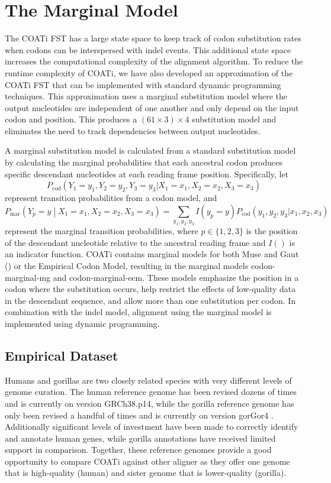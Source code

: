 \documentclass[12pt,letterpaper]{article}
\begin{document}
\section*{The Marginal Model}

The COATi FST has a large state space to keep track of codon substitution rates when codons can be interspersed with indel events. This additional state space increases the computational complexity of the alignment algorithm. To reduce the runtime complexity of COATi, we have also developed an approximation of the COATi FST that can be implemented with standard dynamic programming techniques. This approximation uses a marginal substitution model where the output nucleotides are independent of one another and only depend on the input codon and position. This produces a $\left(61 \times 3 \right) \times 4$ substitution model and eliminates the need to track dependencies between output nucleotides.

A marginal substitution model is calculated from a standard substitution model by calculating the marginal probabilities that each ancestral codon produces specific descendant nucleotides at each reading frame position. Specifically, let
%
\[
P_\text{cod}\left( Y_1 = y_1, Y_2 = y_2, Y_3 = y_3 |
                   X_1 = x_1, X_2 = x_2, X_3 = x_3 \right)
\]
%
represent transition probabilities from a codon model, and
%
\[
P_\text{mar}\left(Y_p = y \middle| X_1 = x_1, X_2 = x_2, X_3 = x_3 \right)
=
\sum_{y_1, y_2, y_3} I(y_p = y)
P_\text{cod}\left( y_1, y_2, y_3 |
                   x_1, x_2, x_3 \right)
\]
%
represent the marginal transition probabilities, where $p \in \{1, 2, 3\}$ is the position of the descendant nucleotide relative to the ancestral reading frame and $I()$ is an indicator function. COATi contains marginal models for both Muse and Gaut (\citeyear{muse_gaut_1994}) or the Empirical Codon Model, resulting in the marginal models codon-marginal-mg and codon-marginal-ecm. These models emphasize the position in a codon where the substitution occurs, help restrict the effects of low-quality data in the descendant sequence, and allow more than one substitution per codon. In combination with the indel model, alignment using the marginal model is implemented using dynamic programming.

\subsection*{Empirical Dataset}

Humans and gorillas are two closely related species with very different levels of genome curation. The human reference genome has been revised dozens of times and is currently on version GRCh38.p14, while the gorilla reference genome has only been revised a handful of times and is currently on version gorGor4 \citep[cf.\ ENSEMBL database v110;][]{ensembl_hubbard_2002}. Additionally significant levels of investment have been made to correctly identify and annotate human genes, while gorilla annotations have received limited support in comparison. Together, these reference genomes provide a good opportunity to compare COATi against other aligner as they offer one genome that is high-quality (human) and sister genome that is lower-quality (gorilla).
\end{document}
